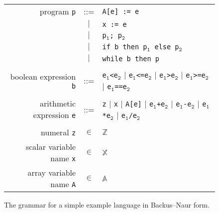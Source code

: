 \begin{figure}[!htb]
\begin{center}
\begin{tabular}{rcl}
	
program \texttt{p} & ::= & \texttt{A[e] := e}\\
  &$|$&  \texttt{x := e}\\
  &$|$&  \texttt{p$_\mathtt{1}$; p$_\mathtt{2}$}\\
  &$|$&  \texttt{if b then p$_\mathtt{1}$ else p$_\mathtt{2}$}\\
  &$|$&  \texttt{while b then p}\\
  \\
  boolean expression \texttt{b} & ::= & \texttt{e$_\mathtt{1}$<e$_\mathtt{2}$} $|$  \texttt{e$_\mathtt{1}$<=e$_\mathtt{2}$} $|$ \texttt{e$_\mathtt{1}$>e$_\mathtt{2}$} $|$ \texttt{e$_\mathtt{1}$>=e$_\mathtt{2}$} $|$ \texttt{e$_\mathtt{1}$==e$_\mathtt{2}$}\\
	\\
	arithmetic expression \texttt{e} & ::= & \texttt{z} $|$ \texttt{x} $|$ \texttt{A[e]} $|$ \texttt{e$_\mathtt{1}$+e$_\mathtt{2}$} $|$ \texttt{e$_\mathtt{1}$-e$_\mathtt{2}$} $|$ \texttt{e$_\mathtt{1}$*e$_\mathtt{2}$} $|$ \texttt{e$_\mathtt{1}$/e$_\mathtt{2}$}\\

  \\
	numeral \texttt{z}&$\in$&$\mathbb{Z}$\\
	scalar variable name \texttt{x}&$\in$&$\mathbb{X}$\\
	array variable name \texttt{A}&$\in$&$\mathbb{A}$\\
\end{tabular}
\end{center}
\caption{The grammar for a simple example language in Backus--Naur form.}\label{fig:bnf_simplelanguage}
\end{figure}